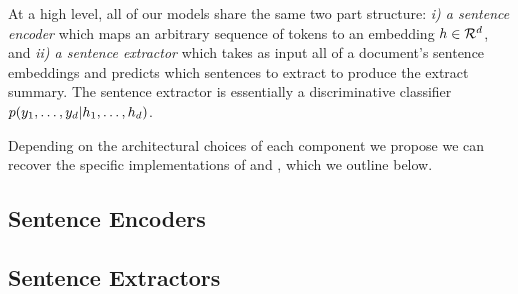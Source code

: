 At a high level, all of our models share the same two part structure: 
\textit{i) a sentence encoder} which maps an arbitrary sequence of tokens to 
an embedding $h \in \mathcal{R}^d$, and 
\textit{ii) a sentence extractor} which takes as input all of a document's 
sentence embeddings and predicts which sentences to extract to produce the 
extract summary. The sentence extractor is essentially a discriminative 
classifier $p(y_1, \ldots, y_{d}| h_1, \ldots, h_{d})$.

Depending on the architectural choices of each component we propose we 
can recover the specific implementations of \cite{cheng&lapata} and 
\cite{nallapati}, which we outline below.

\subsection{Sentence Encoders}


\subsection{Sentence Extractors}

